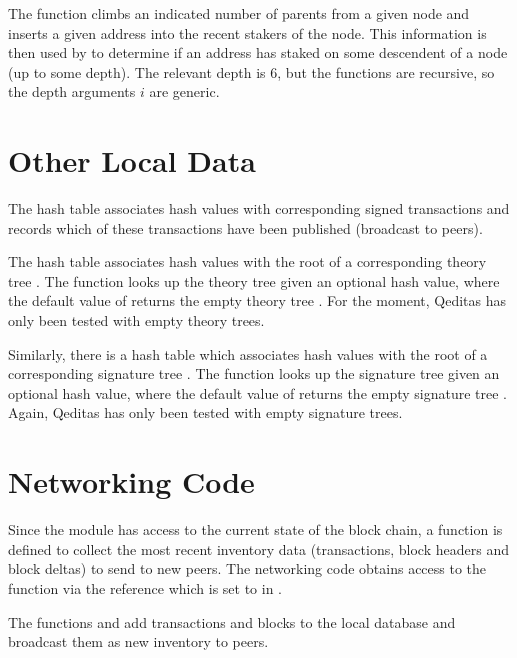 The function {} climbs an indicated number of parents
from a given node and inserts a given address into the recent stakers of the node.
This information is then used by {} to determine if
an address has staked on some descendent of a node (up to some depth).
The relevant depth is $6$, but the functions are recursive, so the depth arguments $i$ are generic.

\section{Other Local Data}

The hash table {} associates hash values with corresponding signed transactions
and {} records which of these transactions have been published (broadcast to peers).

The hash table {} associates hash values with the root of a corresponding theory tree {}.
The function {} looks up the theory tree given an optional hash value, where the default value of {} returns the empty theory tree {}.
For the moment, Qeditas has only been tested with empty theory trees.

Similarly, there is a hash table {} which associates hash values with the root of a corresponding signature tree {}.
The function {} looks up the signature tree given an optional hash value, where the default value of {} returns the empty signature tree {}.
Again, Qeditas has only been tested with empty signature trees.

\section{Networking Code}

Since the {} module has access to the current state of the block chain,
a function {} is defined to collect the most recent inventory data
(transactions, block headers and block deltas) to send to new peers.
The networking code obtains access to the {} function via the reference
{} which is set to {} in {}.

The functions {} and {}
add transactions and blocks to the local database
and broadcast them as new inventory to peers.

